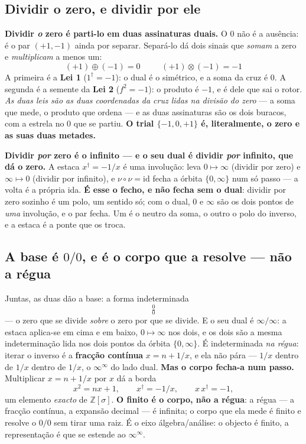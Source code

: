 \documentclass[11pt,a4paper]{article}
\newcommand{\dg}{^{\dagger}}
\begin{document}
\subsection*{Dividir o zero, e dividir por ele}

\textbf{Dividir \emph{o} zero é parti-lo em duas assinaturas duais.} O $0$ não é a ausência: é o par
$(+1,-1)$ ainda por separar. Separá-lo dá dois sinais que \emph{somam} a zero e \emph{multiplicam} a
menos um:
\[
  \boxed{\;(+1)\oplus(-1)=0\;}\qquad\boxed{\;(+1)\otimes(-1)=-1\;}
\]
A primeira é a \textbf{Lei 1} ($1\dg=-1$): o dual é o simétrico, e a soma da cruz é $0$. A segunda é a
semente da \textbf{Lei 2} ($f^2=-1$): o produto é $-1$, e é dele que sai o rotor. \emph{As duas leis são
as duas coordenadas da cruz lidas na divisão do zero} --- a soma que mede, o produto que ordena --- e as
duas assinaturas são os dois buracos, com a estrela no $0$ que se partiu. \textbf{O trial
$\{-1,0,+1\}$ é, literalmente, o zero e as suas duas metades.}

\textbf{Dividir \emph{por} zero é o infinito --- e o seu dual é dividir \emph{por} infinito, que dá o
zero.} A estaca $x\dg=-1/x$ é uma involução: leva $0\mapsto\infty$ (dividir por zero) e $\infty\mapsto0$
(dividir por infinito), e $\nu\circ\nu=\mathrm{id}$ fecha a órbita $\{0,\infty\}$ num só passo --- a volta
é a própria ida. \textbf{É esse o fecho, e não fecha sem o dual}: dividir por zero sozinho é um polo, um
sentido só; com o dual, $0$ e $\infty$ são os dois pontos de \emph{uma} involução, e o par fecha. Um é o
neutro da soma, o outro o polo do inverso, e a estaca é a ponte que os troca.

\subsection*{A base é $0/0$, e é o corpo que a resolve --- não a régua}

Juntas, as duas dão a base: a forma indeterminada
\[
  \boxed{\;\tfrac00\;}
\]
--- o zero que se divide \emph{sobre} o zero por que se divide. E o seu dual é $\infty/\infty$: a estaca
aplica-se em cima e em baixo, $0\mapsto\infty$ nos dois, e os dois são a mesma indeterminação lida nos
dois pontos da órbita $\{0,\infty\}$. É indeterminada \emph{na régua}: iterar o inverso é a
\textbf{fracção contínua} $x=n+1/x$, e ela não pára --- $1/x$ dentro de $1/x$ dentro de $1/x$, o
$\infty^{\infty}$ do lado dual. \textbf{Mas o corpo fecha-a num passo.} Multiplicar $x=n+1/x$
por $x$ dá a borda
\[
  x^2=nx+1,\qquad x\dg=-1/x,\qquad x\,x\dg=-1,
\]
um elemento \emph{exacto} de $\mathbb{Z}[\sigma]$. \textbf{O finito é o corpo, não a régua}: a régua --- a
fracção contínua, a expansão decimal --- é infinita; o corpo que ela mede é finito e resolve o $0/0$ sem
tirar uma raiz. É o eixo álgebra/análise: o objecto é finito, a representação é que se estende ao
$\infty^{\infty}$.
\end{document}
